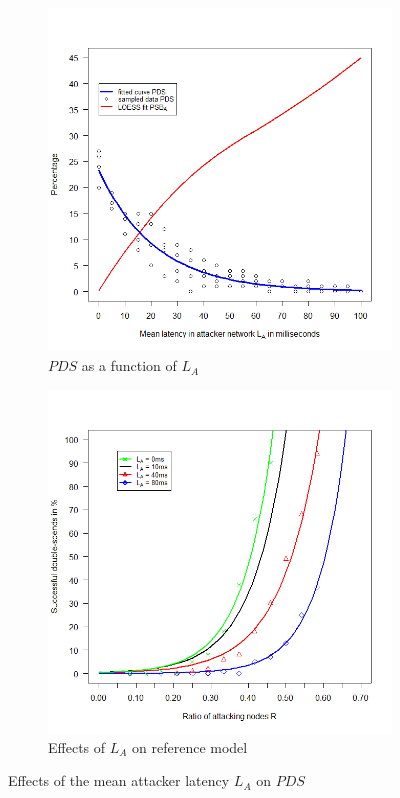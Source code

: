 \documentclass[a4paper,12pt,twoside]{report}
\begin{document}
\begin{figure}
\centering
\begin{subfigure}{.5\textwidth}
  \centering
  \includegraphics[width=\linewidth]{Experiments/AttLatency/attlat.png}
  \caption{$PDS$ as a function of $L_{A}$}
  \label{attlat:a}
\end{subfigure}%
\begin{subfigure}{.5\textwidth}
  \centering
  \includegraphics[width=\linewidth]{Experiments/AttLatency/attrat.png}
  \caption{Effects of $L_{A}$ on reference model}
  \label{attlat:b}
\end{subfigure}
\caption{Effects of the mean attacker latency $L_{A}$ on $PDS$}
\label{attlat}
\end{figure}
\end{document}
